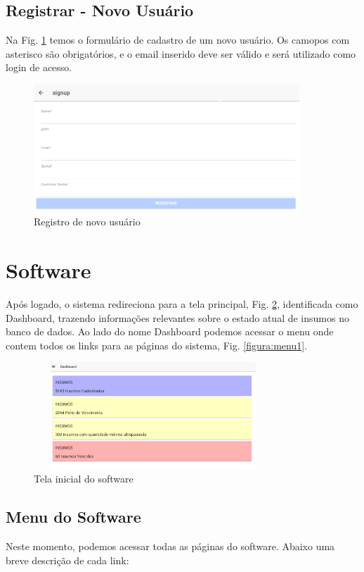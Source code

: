 \documentclass[letterpaper, 12 pt]{article}
\begin{document}
\subsection{Registrar - Novo Usuário}
Na  Fig. \ref{figura:registrar1} temos o formulário de cadastro de um novo usuário. Os camopos com asterisco são obrigatórios, e o email inserido deve ser válido e será utilizado como login de acesso. 

\begin{figure}[h]
\centering %
\includegraphics[width=10cm]{imagens/registrar1.PNG}
\caption{Registro de novo usuário}
\label{figura:registrar1}
\end{figure}

\section{Software}
Após logado, o sistema redireciona para a tela principal, Fig. \ref{figura:dashboard1}, identificada como Dashboard, trazendo informações relevantes sobre o estado atual de insumos no banco de dados. Ao lado do nome Dashboard podemos acessar o menu onde contem todos os links para as páginas do sistema, Fig. \ref{figura:menu1}.

\begin{figure}[h]
\centering %
\includegraphics[width=9cm, height=4cm]{imagens/dashboard1.PNG} 
\caption{Tela inicial do software}
\label{figura:dashboard1}
\end{figure}

\subsection{Menu do Software}
Neste momento, podemos acessar todas as páginas do software. Abaixo uma breve descrição de cada link:
\end{document}
